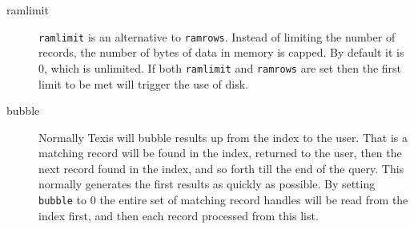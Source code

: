 \begin{description}
\item[ramlimit] \verb`ramlimit` is an alternative to \verb`ramrows`.
Instead of limiting the number of records, the number of bytes of data
in memory is capped.  By default it is 0, which is unlimited.  If both
\verb`ramlimit` and \verb`ramrows` are set then the first limit to be
met will trigger the use of disk.

\item[bubble] Normally Texis will bubble results up from the index to
the user.  That is a matching record will be found in the index, returned
to the user, then the next record found in the index, and so forth till
the end of the query.  This normally generates the first results as quickly
as possible.  By setting \verb`bubble` to 0 the entire set of matching
record handles will be read from the index first, and then each record
processed from this list.


\end{description}
